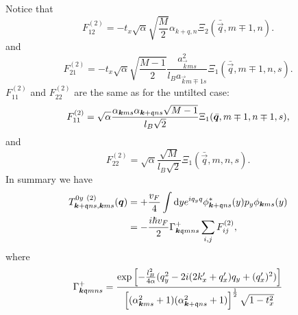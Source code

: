Notice that
\begin{equation}
  F^{(2)}_{12}
  = -t_x \sqrt{\alpha}  \sqrt{\frac{M}{2}} \alpha _{k+q, n} \Xi_2(\bar{\vec{q}}, m\mp 1, n).
\end{equation}
and
\begin{equation}
  \label{eq:55}
  F^{(2)}_{21}
  =
  -t_{x} \sqrt{\alpha} \sqrt{\frac{M-1}{2}} \frac{a_{\vec{k} m s}^2}{l_B a_{\vec{k} m \mp 1 s}}
  \Xi_{1} (\bar{\vec{q}}, m \mp 1, n, s).
\end{equation}
\( F^{(2)}_{11} \) and \( F^{(2)}_{22} \) are the same as for the untilted case:
\begin{equation}
  \label{eq:56}
  F^{(2)}_{11} = \sqrt{\alpha}  \frac{\alpha_{\bm{k} m s} \alpha_{\bm{k} + \mathfrak{q} ns} \sqrt{M-1} }{ l_B \sqrt{2} }
  \Xi_{1} (\bar{\bm{q}}, m\mp 1, n\mp 1, s),
\end{equation}
and
\begin{equation}
  \label{eq:57}
  F^{(2)}_{22} =
  \sqrt{\alpha }
  \frac{\sqrt{M} }{l_B \sqrt{2} }
  \Xi_{1} ( \bar{\vec{q}}, m, n, s ).
\end{equation}
In summary we have
\begin{align}
  \label{eq:58}
  T^{0y~(2)}_{\bm{k} + \mathfrak{q} ns, \bm{k} ms} (\bm{q}) &= + \frac{v_F}{4} \int \mathrm{d} y
  e^{i q_y q} \phi _{\bm{k} + \mathfrak{q} ns}^{*} (y) p_{y} \phi _{\bm{k} ms} (y)\\
&= -\frac{ i \hbar v_{F} }{2}
                                                                                     \Gamma _{\bm{k} \mathfrak{q} m n s}^+
\sum\limits_{i,j}^{} F^{(2)}_{ij},
\end{align}
where
\[
  \Gamma _{\bm{k} \mathfrak{q} m n s}^+ =
  \frac{
  \exp
  \left[
    - \frac{l_{B}^2}{4 \alpha } (q_{y}^2 - 2 i (2k' _x + q' _x) q_{y} + (q' _x)^2 )
  \right  ]
}{
  \left[(\alpha_{\bm{k} m s}^2 +1) (\alpha_{\bm{k} + \mathfrak{q} ns} ^2 + 1)\right]^{\frac{1}{2}}
  \sqrt{1 - t_x^2 }}
\]

